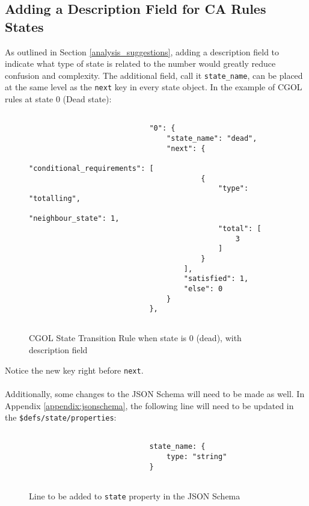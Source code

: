 \subsection{Adding a Description Field for CA Rules States}
As outlined in Section \ref{analysis_suggestions}, adding a description field to indicate what type of state is related to the number would greatly reduce confusion and complexity. The additional field, call it \texttt{state\_name}, can be placed at the same level as the \texttt{next} key in every state object. In the example of CGOL rules at state 0 (Dead state):
\begin{center}
\begin{figure}[H]
\begin{verbatim}

                            "0": {
                                "state_name": "dead",
                                "next": {
                                    "conditional_requirements": [
                                        {
                                            "type": "totalling",
                                            "neighbour_state": 1,
                                            "total": [
                                                3
                                            ]
                                        }
                                    ],
                                    "satisfied": 1,
                                    "else": 0
                                }
                            },
    
\end{verbatim}
\caption{CGOL State Transition Rule when state is 0 (dead), with description field}
\end{figure}
\end{center}
\noindent Notice the new key right before \texttt{next}.
\\ \\
Additionally, some changes to the JSON Schema will need to be made as well. In Appendix \ref{appendix:jsonschema}, the following line will need to be updated in the \texttt{\$defs/state/properties}: 
\begin{center}
\begin{figure}[H]
\begin{verbatim}

                            state_name: { 
                                type: "string"
                            }
    
\end{verbatim}
\caption{Line to be added to \texttt{state} property in the JSON Schema}
\end{figure}
\end{center}
